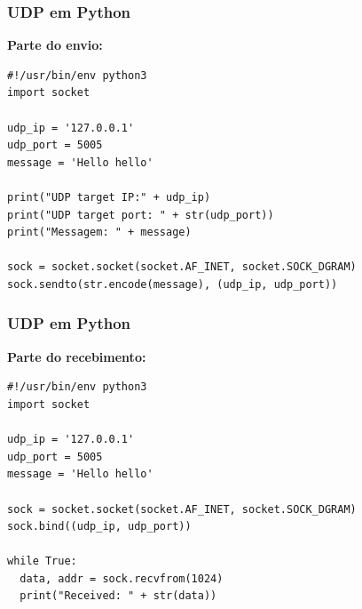 \documentclass[xcolor=dvipsnames,10pt,compress,aspectratio=169]{beamer}
\begin{document}
\begin{frame}
{\begin{center}
  \end{center}
}
\end{frame}

\begin{frame}[fragile]
  \frametitle{UDP em Python}
  {\bf Parte do envio:}
\begin{lstlisting}
#!/usr/bin/env python3
import socket

udp_ip = '127.0.0.1'
udp_port = 5005
message = 'Hello hello'

print("UDP target IP:" + udp_ip)
print("UDP target port: " + str(udp_port))
print("Messagem: " + message)

sock = socket.socket(socket.AF_INET, socket.SOCK_DGRAM)
sock.sendto(str.encode(message), (udp_ip, udp_port))
\end{lstlisting}
\end{frame}

\begin{frame}[fragile]
  \frametitle{UDP em Python}
  {\bf Parte do recebimento:}
\begin{lstlisting}
#!/usr/bin/env python3
import socket

udp_ip = '127.0.0.1'
udp_port = 5005
message = 'Hello hello'

sock = socket.socket(socket.AF_INET, socket.SOCK_DGRAM)
sock.bind((udp_ip, udp_port))

while True:
  data, addr = sock.recvfrom(1024) 
  print("Received: " + str(data))
\end{lstlisting}
\end{frame}
\end{document}
